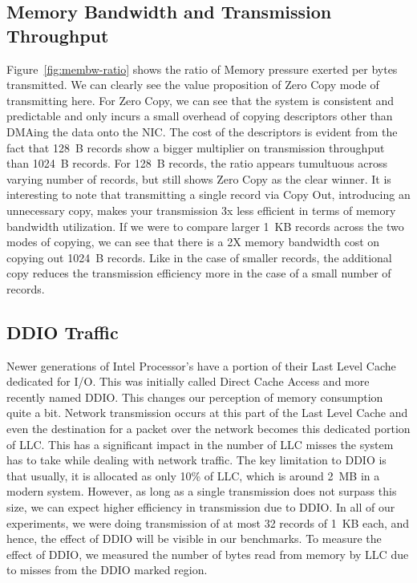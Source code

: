 \subsection{Memory Bandwidth and Transmission Throughput}
\label{sec:membw-savings}
Figure~\ref{fig:membw-ratio} shows the ratio of Memory pressure exerted per bytes transmitted. We can clearly see the value proposition of 
Zero Copy mode of transmitting here. For Zero Copy, we can see that the system is consistent and predictable and only incurs a small overhead of 
copying descriptors other than DMAing the data onto the NIC. The cost of the descriptors is evident from the fact that 128~B records show 
a bigger multiplier on transmission throughput than 1024~B records. For 128~B records, the ratio appears tumultuous across varying number of records, 
 but still shows Zero Copy as the clear winner. It is interesting to note that transmitting a single record via Copy Out, 
 introducing an unnecessary copy, makes your transmission 3x less efficient in terms of memory bandwidth utilization.
  If we were to compare larger 1~KB records across the two modes of copying, we can see that there is a 
 2X memory bandwidth cost on copying out 1024~B records. Like in the case of smaller records, the additional copy reduces the 
 transmission efficiency more in the case of a small number of records.



\subsection{DDIO Traffic}
Newer generations of Intel Processor's have a portion of their Last Level Cache dedicated for I/O. This was initially called Direct Cache Access 
and more recently named DDIO. This changes our perception of memory consumption quite a bit. Network transmission occurs at this part of the Last Level Cache 
and even the destination for a packet over the network becomes this dedicated portion of LLC. This has a significant impact in the number of LLC misses the system 
has to take while dealing with network traffic. The key limitation to DDIO is that usually, it is allocated as only 10\% of LLC, which is around 2~MB in a modern system. 
However, as long as a single transmission does not surpass this size, we can expect higher efficiency in transmission due to DDIO. In all of our experiments, we were doing transmission of 
at most 32 records of 1~KB each, and hence, the effect of DDIO will be visible in our benchmarks. To measure the 
effect of DDIO, we measured the number of bytes read from memory by LLC due to misses from the DDIO marked region. 

